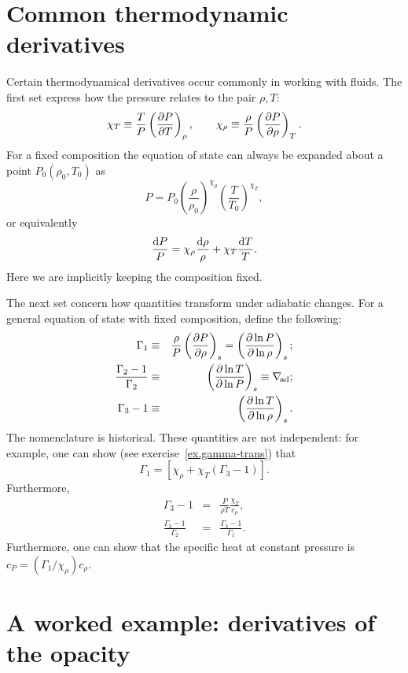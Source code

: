 \section{Common thermodynamic derivatives}

Certain thermodynamical derivatives occur commonly in working with fluids. The first set express how the pressure relates to the pair $\rho,T$:
\begin{equation}
\chi_{T}\equiv\frac{T}{P}\left(\frac{\partial P}{\partial T}\right)_{\rho},\qquad\chi_{\rho}\equiv\frac{\rho}{P}\left(\frac{\partial P}{\partial \rho}\right)_{T}.
\end{equation}
For a fixed composition the equation of state can always be expanded about a point $P_{0}(\rho_{0},T_{0})$ as
\begin{equation}\label{e.eos}
P = P_{0}\left(\frac{\rho}{\rho_{0}}\right)^{\chi_{\rho}}\left(\frac{T}{T_{0}}\right)^{\chi_{T}},
\end{equation}
or equivalently
\[
\frac{\mathrm{d} P}{P} = \chi_{\rho}\frac{\mathrm{d} \rho}{\rho} + \chi_{T}\frac{\mathrm{d} T}{T}.
\]
Here we are implicitly keeping the composition fixed.

The next set concern how quantities transform under adiabatic changes.  For a general equation of state with fixed composition, define the following:
\begin{eqnarray}
\Gamma_{1} &\equiv& \frac{\rho}{P}\left(\frac{\partial P}{\partial \rho}\right)_{s} = \left(\frac{\partial \ln P}{\partial \ln\rho}\right)_{s};\\
\frac{\Gamma_{2}-1}{\Gamma_{2}} &\equiv& \left(\frac{\partial \ln T}{\partial \ln P}\right)_{s} \equiv \nabla_{\!\mathrm{ad}};\\
\Gamma_{3}-1 &\equiv& \left(\frac{\partial \ln T}{\partial \ln \rho}\right)_{s}.
\end{eqnarray}
The nomenclature is historical. These quantities are not independent: for example, one can show (see exercise~\ref{ex.gamma-trans}) that
\[
\Gamma_{1} = \left[\chi_{\rho} + \chi_{T}\left(\Gamma_{3}-1\right)\right].
\]
Furthermore,
\begin{eqnarray*}
\Gamma_{3}-1 &=& \frac{P}{\rho T}\frac{\chi_{T}}{c_{\rho}},\\
\frac{\Gamma_{2}-1}{\Gamma_{2}} &=& \frac{\Gamma_{3}-1}{\Gamma_{1}}.
\end{eqnarray*}
Furthermore, one can show that the specific heat at constant pressure is $c_{P} = (\Gamma_{1}/\chi_{\rho})c_{\rho}$.

\section{A worked example: derivatives of the opacity}

